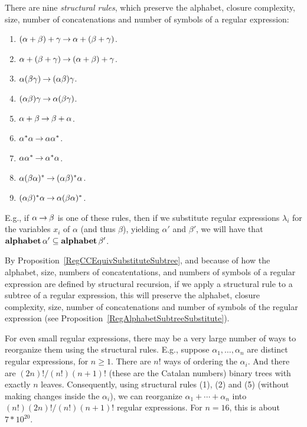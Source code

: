 There are nine \emph{structural rules},
%
%
%
which preserve the alphabet, closure complexity, size, number of
concatenations and number of symbols of a regular expression:
\begin{enumerate}[\quad(1)]
\item $(\alpha + \beta) + \gamma \mathbin{\to} \alpha + (\beta + \gamma)$.

\item $\alpha + (\beta + \gamma) \mathbin{\to} (\alpha + \beta) + \gamma$.

\item $\alpha(\beta\gamma) \mathbin{\to} (\alpha\beta)\gamma$.

\item $(\alpha\beta)\gamma \mathbin{\to} \alpha(\beta\gamma)$.

\item $\alpha + \beta \mathbin{\to} \beta + \alpha$.

\item $\alpha^*\alpha \mathbin{\to} \alpha\alpha^*$.

\item $\alpha\alpha^* \mathbin{\to} \alpha^*\alpha$.

\item $\alpha(\beta\alpha)^* \mathbin{\to} (\alpha\beta)^*\alpha$.

\item $(\alpha\beta)^*\alpha \mathbin{\to} \alpha(\beta\alpha)^*$.
\end{enumerate}
E.g., if $\alpha\mathbin{\to}\beta$ is one of these rules, then if we
substitute regular expressions $\lambda_i$ for the variables $x_i$ of
$\alpha$ (and thus $\beta$), yielding $\alpha'$ and $\beta'$, we will
have that $\mathbf{alphabet}\,\alpha'\subseteq\mathbf{alphabet}\,\beta'$.

By Proposition~\ref{RegCCEquivSubstituteSubtree}, and because of how
the alphabet, size, numbers of concatentations, and numbers of symbols
of a regular expression are defined by structural recursion, if we
apply a structural rule to a subtree of a regular expression, this
will preserve the alphabet, closure complexity, size, number of
concatenations and number of symbols of the regular expression
(see Proposition~\ref{RegAlphabetSubtreeSubstitute}).

For even small regular expressions, there may be a very large number
of ways to reorganize them using the structural rules. E.g., suppose
$\alpha_1,\ldots,\alpha_n$ are distinct regular expressions, for
$n\geq 1$. There are $n!$ ways of ordering the $\alpha_i$.  And there
are $(2n)! / (n!)(n+1)!$ (these are the Catalan numbers) binary trees
with exactly $n$ leaves. Consequently, using structural rules (1), (2)
and (5) (without making changes inside the $\alpha_i$), we can
reorganize $\alpha_1+\cdots+\alpha_n$ into $(n!)(2n)! / (n!)(n+1)!$
regular expressions. For $n=16$, this is about $7*10^{20}$.

